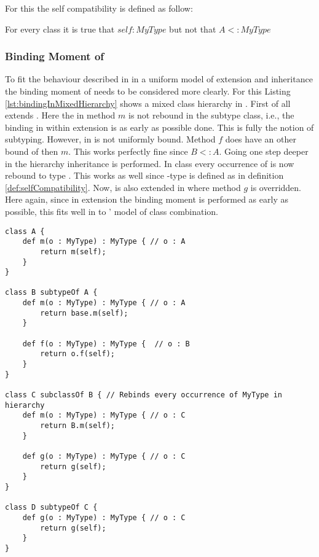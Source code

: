 For this the self compatibility is defined as follow:

\begin{defn}
	\label{def:selfCompatibility}
	For every class \A it is true that $self : MyType$ but not that $A <: MyType$
\end{defn}

\subsubsection{Binding Moment of \mytype}
To fit the behaviour described in  in
a uniform model of extension and inheritance the binding moment
of \mytype needs to be considered more clearly. For this Listing
\ref{lst:bindingInMixedHierarchy} shows a mixed class hierarchy in
\ooplss. First of all \B extends \A. Here the \mytype in method $m$ is
not rebound in the subtype class, i.e., the \mytype binding in within
extension is as early as possible done. This is fully the notion of
subtyping. However, in \B is \mytype not uniformly bound. Method $f$
does have an other bound of \mytype then $m$. This works perfectly fine
since $B <: A$. Going one step deeper in the hierarchy inheritance is
performed. In class \C every occurrence of \mytype is now rebound to
type \C. This works as well since \self-type is defined as in definition
\ref{def:selfCompatibility}. Now, \C is also extended in \D where method
$g$ is overridden. Here again, since in extension the binding moment is
performed as early as possible, this fits well in to \ooplss' model of
class combination.

\begin{lstlisting}[float,language=ooplss,caption=Binding of \self and \mytype in a mixed context,label=lst:bindingInMixedHierarchy]
class A {
	def m(o : MyType) : MyType { // o : A
		return m(self); 
	}
}

class B subtypeOf A {
	def m(o : MyType) : MyType { // o : A
		return base.m(self);
	}

	def f(o : MyType) : MyType {  // o : B
		return o.f(self); 
	}
}

class C subclassOf B { // Rebinds every occurrence of MyType in hierarchy
	def m(o : MyType) : MyType { // o : C
		return B.m(self);
	}

	def g(o : MyType) : MyType { // o : C
		return g(self);
	}
}

class D subtypeOf C {
	def g(o : MyType) : MyType { // o : C
		return g(self);
	}
}
\end{lstlisting}


